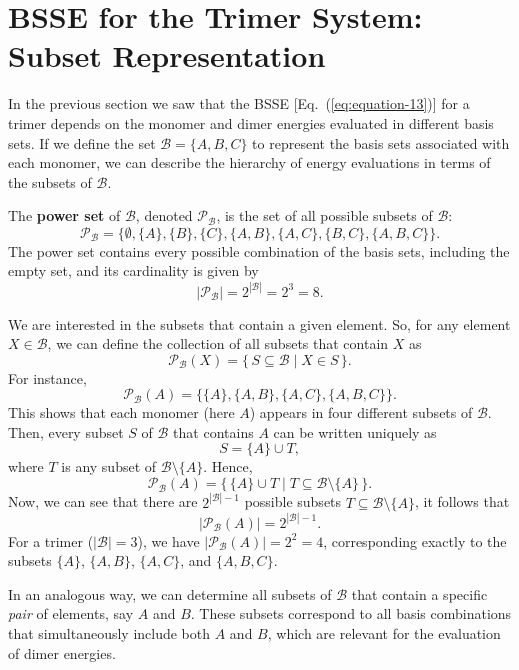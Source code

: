 \section{BSSE for the Trimer System: Subset Representation}
\label{sec:bsse_trimer}

In the previous section we saw that the BSSE
[Eq.~(\ref{eq:equation-13})]
for a trimer depends on the monomer and dimer energies
evaluated in different basis sets.
If we define the set
\(\mathcal{B} = \{A,B,C\}\)
to represent the basis sets associated with each monomer,
we can describe the hierarchy of energy evaluations
in terms of the subsets of \(\mathcal{B}\).

\noindent
The \textbf{power set} of \(\mathcal{B}\),
denoted \(\mathcal{P}_{\mathcal{B}}\),
is the set of all possible subsets of \(\mathcal{B}\):
\[
\mathcal{P}_{\mathcal{B}}
   = \bigl\{
      \emptyset,
      \{A\},\{B\},\{C\},
      \{A,B\},\{A,C\},\{B,C\},
      \{A,B,C\}
     \bigr\}.
\]
The power set contains every possible combination of the basis sets,
including the empty set,
and its cardinality is given by
\[
|\mathcal{P}_{\mathcal{B}}| = 2^{|\mathcal{B}|} = 2^3 = 8.
\]

\noindent
We are interested in the subsets that contain a given element. So, for any element \(X \in \mathcal{B}\),
we can define the collection of all subsets that contain \(X\) as
\[
\mathcal{P}_{\mathcal{B}}(X)
   = \{\, S \subseteq \mathcal{B} \mid X \in S \,\}.
\]
For instance,
\[
\mathcal{P}_{\mathcal{B}}(A)
   = \{\{A\}, \{A,B\}, \{A,C\}, \{A,B,C\}\}.
\]
\clearpage
This shows that each monomer (here \(A\)) appears in four different subsets of \(\mathcal{B}\). Then, every subset \(S\) of \(\mathcal{B}\) that contains \(A\) can be written uniquely as
\[
S = \{A\} \cup T,
\]
where \(T\) is any subset of \(\mathcal{B}\setminus\{A\}\).
Hence,
\[
\boxed{
\mathcal{P}_{\mathcal{B}}(A)
   = \bigl\{\, \{A\}\cup T \;\big|\;
     T\subseteq\mathcal{B}\setminus\{A\}\,\bigr\}.
}
\]
Now, we can see that there are \(2^{|\mathcal{B}|-1}\) possible subsets
\(T\subseteq\mathcal{B}\setminus\{A\}\),
it follows that
\[
|\mathcal{P}_{\mathcal{B}}(A)| = 2^{|\mathcal{B}|-1}.
\]
For a trimer (\(|\mathcal{B}|=3\)),
we have \( |\mathcal{P}_{\mathcal{B}}(A)| = 2^{2} = 4\),
corresponding exactly to the subsets
\(\{A\}\), \(\{A,B\}\), \(\{A,C\}\), and \(\{A,B,C\}\).

\noindent
In an analogous way, we can determine all subsets of
\(\mathcal{B}\) that contain a specific \emph{pair} of elements,
say \(A\) and \(B\).
These subsets correspond to all basis combinations
that simultaneously include both \(A\) and \(B\),
which are relevant for the evaluation of dimer energies.

